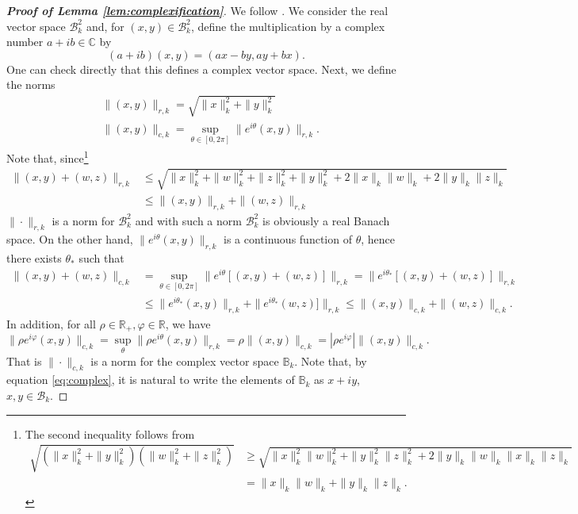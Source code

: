 \documentclass{amsart}
\numberwithin{equation}{section}
\newcommand\cB{{\mathcal B}}
\newcommand\bB{{\mathbb B}}
\newcommand\bC{{\mathbb C}}
\newcommand\bR{{\mathbb R}}
\newcommand\vf{\varphi}
\begin{document}
\begin{proof}[\bf \em Proof of Lemma \ref{lem:complexification}]
We follow \cite[Section 1 (b)]{Sing}. We consider the real vector space $\cB_k^2$ and, for $(x,y)\in\cB_k^2$, define the multiplication by a complex number $a+ib\in\bC$ by
\begin{equation}\label{eq:complex}
(a+ib)(x,y)=(ax-by,ay+bx).
\end{equation}
One can check directly that this defines a complex vector space. Next, we define the norms
\[
\begin{split}
&\|(x,y)\|_{r,k}=\sqrt{\|x\|_k^2+\|y\|_k^2}\\
&\|(x,y)\|_{c,k}=\sup_{\theta\in [0,2\pi]}\|e^{i\theta}(x,y)\|_{r,k}.
\end{split}
\]
Note that, since\footnote{ The second inequality follows  from
\[
\begin{split}
\sqrt{(\|x\|_k^2+\|y\|_k^2)(\|w\|_k^2+\|z\|_k^2)}&\geq \sqrt{\|x\|_k^2\|w\|_k^2+\|y\|_k^2\|z\|_k^2+2\|y\|_k\|w\|_k\|x\|_k\|z\|_k}\\
&=\|x\|_k\|w\|_k+\|y\|_k\|z\|_k.
\end{split}
\]
}
\[
\begin{split}
\|(x,y)+(w,z)\|_{r,k}&\leq \sqrt{\|x\|_k^2+\|w\|_k^2+\|z\|_k^2+\|y\|_k^2+2\|x\|_k\|w\|_k+2\|y\|_k\|z\|_k}\\
&\leq \|(x,y)\|_{r,k}+\|(w,z)\|_{r,k}
\end{split}
\]
$\|\cdot\|_{r,k}$ is a norm for $\cB_k^2$ and with such a norm $\cB_k^2$ is obviously a real Banach space. On the other hand, $\|e^{i\theta}(x,y)\|_{r,k}$ is a continuous function of $\theta$, hence there exists $\theta_*$ such that
\[
\begin{split}
\|(x,y)+(w,z)\|_{c,k}&=\sup_{\theta\in [0,2\pi]}\|e^{i\theta}[(x,y)+(w,z)]\|_{r,k}=\|e^{i\theta_*}[(x,y)+(w,z)]\|_{r,k}\\
&\leq\|e^{i\theta_*}(x,y)\|_{r,k}+\|e^{i\theta_*}(w,z)]\|_{r,k}\leq \|(x,y)\|_{c,k}+\|(w,z)\|_{c,k}.
\end{split}
\]
In addition, for all $\rho\in\bR_+,\vf\in\bR$, we have
\[
\|\rho e^{i\vf}(x,y)\|_{c,k}=\sup_{\theta}\|\rho e^{i\theta}(x,y)\|_{r,k}=\rho\|(x,y)\|_{c,k}=|\rho e^{i\vf}|\|(x,y)\|_{c,k}.
\]
That is $\|\cdot\|_{c,k}$ is a norm for the complex vector space $\bB_k$. Note that, by equation \eqref{eq:complex}, it is natural to write the elements of $\bB_k$ as $x+iy$, $x,y\in \cB_k$.


\end{proof}
\end{document}
